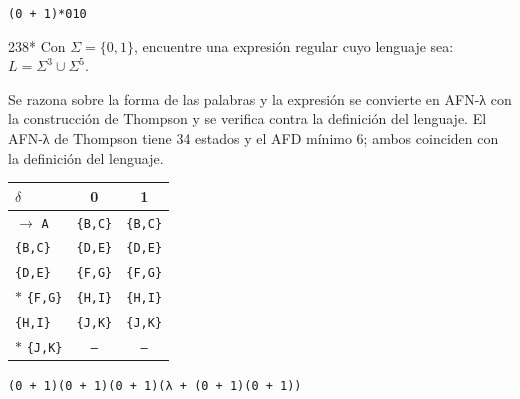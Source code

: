 \documentclass[11pt]{article}
\begin{document}
\resp \texttt{(0 + 1)*010}


\begin{ejercicio}{238}{*}
Con $\Sigma = \{0, 1\}$, encuentre una expresión regular cuyo lenguaje sea: $L = \Sigma^3 \cup \Sigma^5$.
\end{ejercicio}
\proc Se razona sobre la forma de las palabras y la expresión se convierte en AFN-λ con la construcción de Thompson y se verifica contra la definición del lenguaje. El AFN-λ de Thompson tiene 34 estados y el AFD mínimo 6; ambos coinciden con la definición del lenguaje.
\begin{center}\small\begin{tabular}{lcc}\toprule
$\delta$ & 0 & 1 \\\midrule
$\to$ \texttt{A} & \texttt{\{B,C\}} & \texttt{\{B,C\}} \\
 \texttt{\{B,C\}} & \texttt{\{D,E\}} & \texttt{\{D,E\}} \\
 \texttt{\{D,E\}} & \texttt{\{F,G\}} & \texttt{\{F,G\}} \\
$*$ \texttt{\{F,G\}} & \texttt{\{H,I\}} & \texttt{\{H,I\}} \\
 \texttt{\{H,I\}} & \texttt{\{J,K\}} & \texttt{\{J,K\}} \\
$*$ \texttt{\{J,K\}} & \texttt{--} & \texttt{--} \\
\bottomrule\end{tabular}\end{center}

\resp \texttt{(0 + 1)(0 + 1)(0 + 1)(λ + (0 + 1)(0 + 1))}
\end{document}
